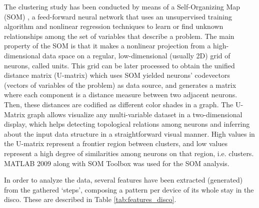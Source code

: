 \documentclass[preprint]{elsarticle}
\begin{document}
The clustering study has been conducted by means of a Self-Organizing Map (SOM) \cite{Kohonen90}, a feed-forward neural network \cite{NN_Haykin94} that uses an unsupervised training algorithm and nonlinear regression techniques to learn or find unknown relationships among the set of variables that describe a problem. The main property of the SOM is that it makes a nonlinear projection from a high-dimensional data space on a regular, low-dimensional (usually 2D) grid of neurons, called units. This grid can be later processed to obtain the unified distance matrix (U-matrix) \cite{UmatUlts} which uses SOM yielded neurons' codevectors (vectors of variables of the problem) as data source, and generates a matrix where each component is a distance measure between two adjacent neurons. Then, these distances are codified as different color shades in a graph.
The U-Matrix graph allows visualize any multi-variable dataset in a two-dimensional display, which helps detecting topological relations among neurons and inferring about the input data structure in a straightforward visual manner. High values in the U-matrix represent a frontier region between clusters, and low values represent a high degree of similarities among neurons on that region, i.e. clusters. MATLAB 2009 along with SOM Toolbox \cite{SOMPAK} was used for the SOM analysis.


In order to analyze the data, several features have been extracted (generated) from the gathered `steps', composing a pattern per device of its whole stay in the disco. These are described in Table \ref{tab:features_disco}.
\end{document}
